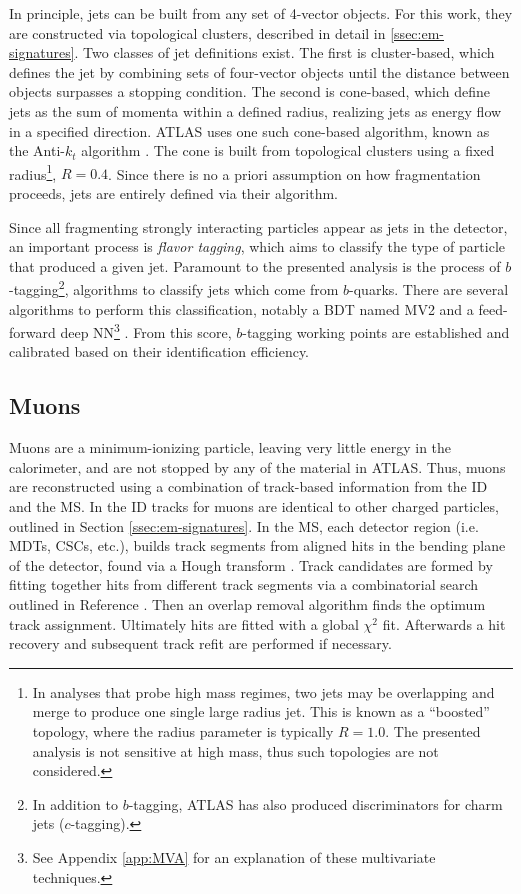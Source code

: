 In principle, jets can be built from any set of 4-vector objects. For this work, they are constructed via topological clusters, described in detail in \ref{ssec:em-signatures}. Two classes of jet definitions exist. The first is cluster-based, which defines the jet by combining sets of four-vector objects until the distance between objects surpasses a stopping condition. The second is cone-based, which define jets as the sum of momenta within a defined radius, realizing jets as energy flow in a specified direction. ATLAS uses one such cone-based algorithm, known as the Anti-$k_t$ algorithm \cite{anti-kt}. The cone is built from topological clusters using a fixed radius\footnote{In analyses that probe high mass regimes, two jets may be overlapping and merge to produce one single large radius jet. This is known as a ``boosted'' topology, where the radius parameter is typically $R=1.0$. The presented analysis is not sensitive at high mass, thus such topologies are not considered.}, $R=0.4$. Since there is no a priori assumption on how fragmentation proceeds, jets are entirely defined via their algorithm.


Since all fragmenting strongly interacting particles appear as jets in the detector, an important process is \textit{flavor tagging}, which aims to classify the type of particle that produced a given jet. Paramount to the presented analysis is the process of $b$-tagging\footnote{In addition to $b$-tagging, ATLAS has also produced discriminators for charm jets ($c$-tagging).}, algorithms to classify jets which come from $b$-quarks. There are several algorithms to perform this classification, notably a \gls{BDT} named MV2 \cite{mv2-dl1} and a feed-forward deep \gls{NN}\footnote{See Appendix \ref{app:MVA} for an explanation of these multivariate techniques.} \cite{mv2-dl1}. From this score, $b$-tagging working points are established and calibrated based on their identification efficiency. 


\subsection{Muons} \label{ssec:muon-reco}

Muons are a minimum-ionizing particle, leaving very little energy in the calorimeter, and are not stopped by any of the material in ATLAS. Thus, muons are reconstructed using a combination of track-based information from the \gls{ID} and the \gls{MS}. In the \gls{ID} tracks for muons are identical to other charged particles, outlined in Section \ref{ssec:em-signatures}. In the \gls{MS}, each detector region (i.e. \glspl{MDT}, \glspl{CSC}, etc.), builds track segments from aligned hits in the bending plane of the detector, found via a Hough transform \cite{hough-transf}. Track candidates are formed by fitting together hits from different track segments via a combinatorial search outlined in Reference \cite{muon-reco}. Then an overlap removal algorithm finds the optimum track assignment. Ultimately hits are fitted with a global $\chi^2$ fit. Afterwards a hit recovery and subsequent track refit are performed if necessary.

